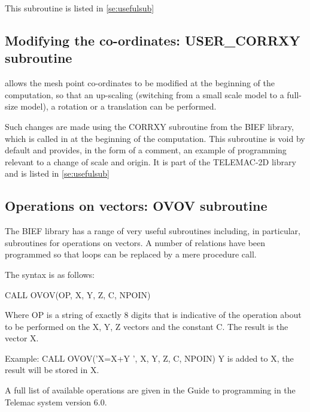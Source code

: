  This subroutine is listed in \ref{se:usefulsub}


\subsection{ Modifying the co-ordinates: USER\_CORRXY subroutine }

 \tomawac allows the mesh point co-ordinates to be modified at the beginning of the computation, so that an up-scaling (switching from a small scale model to a full-size model), a rotation or a translation can be performed.

 Such changes are made using the CORRXY subroutine from the BIEF library, which is called in at the beginning of the computation. This subroutine is void by default and provides, in the form of a comment, an example of programming relevant to a change of scale and origin. It is part of the TELEMAC-2D library and is listed in \ref{se:usefulsub}

\subsection{ Operations on vectors: OVOV subroutine }

 The BIEF library has a range of very useful subroutines including, in particular, subroutines for operations on vectors. A number of relations have been programmed so that loops can be replaced by a mere procedure call.

 The syntax is as follows:

 CALL OVOV(OP, X, Y, Z, C, NPOIN)

 Where OP is a string of exactly 8 digits that is indicative of the operation about to be performed on the X, Y, Z vectors and the constant C. The result is the vector X.

 Example:  CALL OVOV('X=X+Y ', X, Y, Z, C, NPOIN)  Y is added to X, the result will be stored in X.

 A full list of available operations are given in the Guide to programming in the Telemac system version 6.0.
